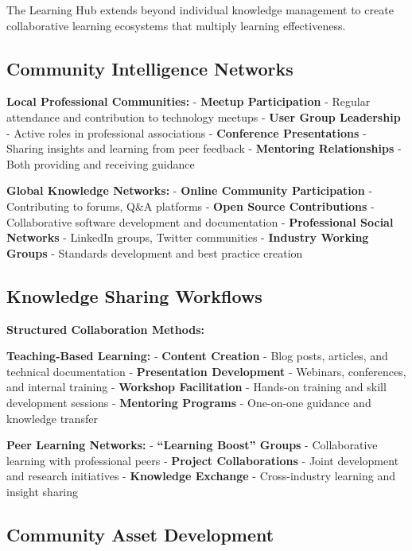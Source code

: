 \documentclass[
  letterpaper,
  DIV=11,
  numbers=noendperiod]{scrartcl}
\begin{document}
The Learning Hub extends beyond individual knowledge management to
create collaborative learning ecosystems that multiply learning
effectiveness.

\subsection{Community Intelligence
Networks}\label{community-intelligence-networks}

\textbf{Local Professional Communities:} - \textbf{Meetup Participation}
- Regular attendance and contribution to technology meetups -
\textbf{User Group Leadership} - Active roles in professional
associations - \textbf{Conference Presentations} - Sharing insights and
learning from peer feedback - \textbf{Mentoring Relationships} - Both
providing and receiving guidance

\textbf{Global Knowledge Networks:} - \textbf{Online Community
Participation} - Contributing to forums, Q\&A platforms - \textbf{Open
Source Contributions} - Collaborative software development and
documentation - \textbf{Professional Social Networks} - LinkedIn groups,
Twitter communities - \textbf{Industry Working Groups} - Standards
development and best practice creation

\subsection{Knowledge Sharing
Workflows}\label{knowledge-sharing-workflows}

\textbf{Structured Collaboration Methods:}

\textbf{Teaching-Based Learning:} - \textbf{Content Creation} - Blog
posts, articles, and technical documentation - \textbf{Presentation
Development} - Webinars, conferences, and internal training -
\textbf{Workshop Facilitation} - Hands-on training and skill development
sessions - \textbf{Mentoring Programs} - One-on-one guidance and
knowledge transfer

\textbf{Peer Learning Networks:} - \textbf{``Learning Boost'' Groups} -
Collaborative learning with professional peers - \textbf{Project
Collaborations} - Joint development and research initiatives -
\textbf{Knowledge Exchange} - Cross-industry learning and insight
sharing

\subsection{Community Asset
Development}\label{community-asset-development}
\end{document}
